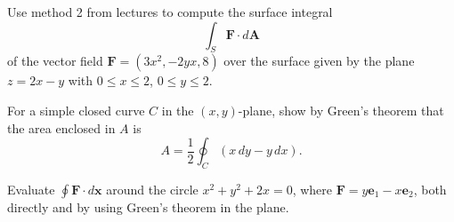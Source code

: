 
\setcounter{question}{80}
\question Use method 2 from lectures to compute the surface integral
\[
    \int_S \bm F \cdot d\bm A
\]
of the vector field 
$\bm F = (3x^2, -2yx, 8)$ 
over the surface given by the plane
$z = 2x - y$ 
with
$0 \leq x \leq 2$, $0 \leq y \leq 2$.

\question For a simple closed curve $C$ in the $(x,y)$-plane,
show by Green's theorem that the area enclosed in $A$ is
\[
    A = \frac12 \oint_C (x\,dy - y\, dx).
\]

\question Evaluate 
$\oint\bm F \cdot d\bm x$
around the circle
$x^2 + y^2 + 2x = 0$,
where $\bm F = y\bm e_1 - x\bm e_2$,
both directly and by using Green's theorem in the plane.
